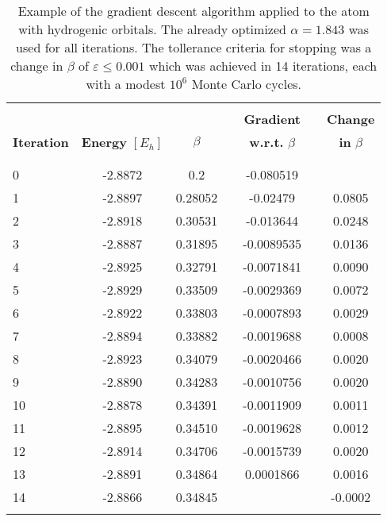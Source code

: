 \documentclass[../../master.tex]{subfiles}
\begin{document}
\begin{table}
\centering{}
\setlength\extrarowheight{2pt}
\begin{tabularx}{\textwidth}{X *{6}{S[table-format=-1.3,table-space-text-post=***]}}
\hline
\hline
\\[-0.9em]
                   &                          &          &  & \textbf{Gradient}        & & \textbf{Change}\\
\textbf{Iteration} & \textbf{Energy} $[E_h]$  &  $\beta$ &  & \textbf{w.r.t. } $\beta$ & & \textbf{in } $\beta$\\
\\[-0.9em]
\hline
\\[-0.9em]
     0   &   -2.8872   &       0.2 & & -0.080519  &  &         \\
     1   &   -2.8897   &   0.28052 & & -0.02479  &   & 0.0805 \\
     2   &   -2.8918   &   0.30531 & & -0.013644  &  &  0.0248 \\
     3   &   -2.8887   &   0.31895 & & -0.0089535  & &   0.0136 \\
     4   &   -2.8925   &   0.32791 & & -0.0071841  & &   0.0090 \\
     5   &   -2.8929   &   0.33509 & & -0.0029369  & &   0.0072 \\
     6   &   -2.8922   &   0.33803 & & -0.0007893  & &   0.0029 \\
     7   &   -2.8894   &   0.33882 & & -0.0019688  & &   0.0008 \\
     8   &   -2.8923   &   0.34079 & & -0.0020466  & &   0.0020 \\
     9   &   -2.8890   &   0.34283 & & -0.0010756  & &   0.0020 \\
    10   &   -2.8878   &   0.34391 & & -0.0011909  & &   0.0011 \\
    11   &   -2.8895   &   0.34510 & & -0.0019628  & &   0.0012 \\
    12   &   -2.8914   &   0.34706 & & -0.0015739  & &   0.0020 \\
    13   &   -2.8891   &   0.34864 & &  0.0001866  & &   0.0016 \\ 
    14   &   -2.8866   &   0.34845 & &   & &  -0.0002 \\
    \\[-0.9em]
\hline
\end{tabularx}
\caption{Example of the gradient descent algorithm applied to the  atom with hydrogenic orbitals. The already optimized $\alpha=1.843$ was used for all iterations. The tollerance criteria for stopping was a change in $\beta$ of $\varepsilon\le0.001$ which was achieved in 14 iterations, each with a modest $10^6$ Monte Carlo cycles. \label{tab:gradd}}
\end{table}
\end{document}
